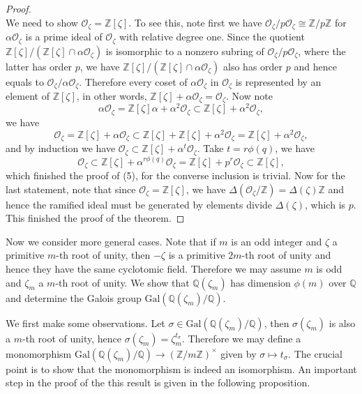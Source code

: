 \begin{proof}
$$$$
We need to show $\mathcal{O}_\zeta=\mathbb{Z}[\zeta]$. To see this, note first we have $\mathcal{O}_\zeta/p\mathcal{O}_\zeta\cong\mathbb{Z}/p\mathbb{Z}$ for $\alpha\mathcal{O}_\zeta$ is a prime ideal of $\mathcal{O}_\zeta$ with relative degree one. Since the quotient $\mathbb{Z}[\zeta]/(\mathbb{Z}[\zeta]\cap\alpha\mathcal{O}_\zeta)$ is isomorphic to a nonzero subring of $\mathcal{O}_\zeta/p\mathcal{O}_\zeta$, where the latter has order $p$, we have $\mathbb{Z}[\zeta]/(\mathbb{Z}[\zeta]\cap\alpha\mathcal{O}_\zeta)$ also has order $p$ and hence equals to $\mathcal{O}_\zeta/\alpha\mathcal{O}_\zeta$. Therefore every coset of $\alpha\mathcal{O}_\zeta$ in $\mathcal{O}_\zeta$ is represented by an element of $\mathbb{Z}[\zeta]$, in other words, $\mathbb{Z}[\zeta]+\alpha\mathcal{O}_\zeta=\mathcal{O}_\zeta$. Now note 
$$
\alpha \mathcal{O} _{\zeta}=\mathbb{Z} \left[ \zeta \right] \alpha +\alpha ^2\mathcal{O} _{\zeta}\subset \mathbb{Z} \left[ \zeta \right] +\alpha ^2\mathcal{O} _{\zeta},
$$
we have 
$$
\mathcal{O} _{\zeta}=\mathbb{Z} \left[ \zeta \right] +\alpha \mathcal{O} _{\zeta}\subset \mathbb{Z} \left[ \zeta \right] +\mathbb{Z} \left[ \zeta \right] +\alpha ^2\mathcal{O} _{\zeta}=\mathbb{Z} \left[ \zeta \right] +\alpha ^2\mathcal{O} _{\zeta},
$$
and by induction we have $\mathcal{O} _{\zeta}\subset \mathbb{Z} \left[ \zeta \right] +\alpha ^t\mathcal{O} _{\zeta}$. Take $t=r\phi(q)$, we have 
$$
\mathcal{O} _{\zeta}\subset \mathbb{Z} \left[ \zeta \right] +\alpha ^{r\phi \left( q \right)}\mathcal{O} _{\zeta}=\mathbb{Z} \left[ \zeta \right] +p^r\mathcal{O} _{\zeta}\subset \mathbb{Z} \left[ \zeta \right] ,
$$
which finished the proof of (5), for the converse inclusion is trivial. Now for the last statement, note that since $\mathcal{O}_\zeta=\mathbb{Z}[\zeta]$, we have $\Delta \left( \mathcal{O} _{\zeta}/\mathbb{Z} \right) =\Delta \left( \zeta \right) \mathbb{Z} $ and hence the ramified ideal must be generated by elements divide $\Delta(\zeta)$, which is $p$. This finished the proof of the theorem.
\end{proof}
Now we consider more general cases. Note that if $m$ is an odd integer and $\zeta$ a primitive $m$-th root of unity, then $-\zeta$ is a primitive $2m$-th root of unity and hence they have the same cyclotomic field. Therefore we may assume $m$ is odd and $\zeta_m$ a $m$-th root of unity. We show that $\mathbb{Q}(\zeta_m)$ has dimension $\phi(m)$ over $\mathbb{Q}$ and determine the Galois group $\mathrm{Gal}(\mathbb{Q}(\zeta_m)/\mathbb{Q})$.\par
We first make some observations. Let $\sigma\in\mathrm{Gal}(\mathbb{Q}(\zeta_m)/\mathbb{Q})$, then $\sigma(\zeta_m)$ is also a $m$-th root of unity, hence $\sigma(\zeta_m)=\zeta_m^{t_\sigma}$. Therefore we may define a monomorphism $\mathrm{Gal}(\mathbb{Q}(\zeta_m)/\mathbb{Q})\to(\mathbb{Z}/m\mathbb{Z})^\times$ given by $\sigma\mapsto t_\sigma$. The crucial point is to show that the monomorphism is indeed an isomorphism. An important step in the proof of the this result is given in the following proposition.

